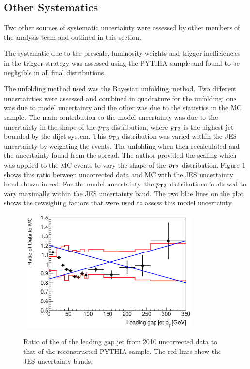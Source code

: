 \subsection {Other Systematics}
Two other sources of systematic uncertainty were assessed  by other members of the analysis team and outlined in this section.

The systematic due to the prescale, luminosity weights and trigger inefficiencies in the trigger strategy was assessed using the PYTHIA sample and found to be negligible in all final distributions.

The unfolding method used was the Bayesian unfolding method.
Two different uncertainties were assessed and combined in quadrature for the unfolding; one was due to model uncertainty and the other was due to the statistics in the MC sample. 
The main contribution to the model uncertainty was due to the uncertainty in the shape of the $\mbox{$p_{\rm T}$}{}_3$ distribution, where $\mbox{$p_{\rm T}$}{}_3$ is the highest \pt{} jet bounded by the dijet system. 
This $\mbox{$p_{\rm T}$}{}_3$ distribution was varied within the JES uncertainty by weighting the events. 
The unfolding when then recalculated and the uncertainty found from the spread.
The author provided the scaling which was applied to the MC events to vary the shape of the $\mbox{$p_{\rm T}$}{}_3$ distribution.
Figure \ref{GBJ2:Uncorr:pt3} shows this ratio between uncorrected data and MC with the JES uncertainty band shown in red.
For the model uncertainty, the $\mbox{$p_{\rm T}$}{}_3$ distributions is allowed to vary maximally within the JES uncertainty band.
The two blue lines on the plot shows the reweighing factors that were used to assess this model uncertainty.
\begin{figure}
\centering
\mbox{
   \includegraphics[width=0.8\textwidth]{figures/GBJ2/ControlPlots/Ratio___pt3.eps}
}
\caption[Comparison of the data and PYTHIA for the \pt{} of the leading gap jet]{
Ratio of the \pt{} of the leading gap jet from 2010 uncorrected data to that of the reconstructed PYTHIA sample.
The red lines show the JES uncertainty bands.
\label{GBJ2:Uncorr:pt3}}
\end{figure}


